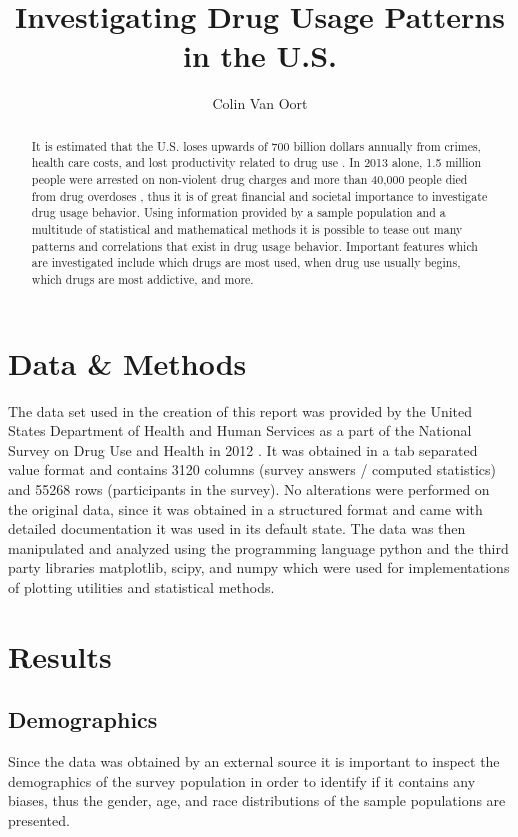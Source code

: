 \documentclass[a4 paper]{article}
\title{Investigating Drug Usage Patterns in the U.S.}
\author{Colin Van Oort}
\begin{document}
\maketitle

\begin{abstract}
It is estimated that the U.S. loses upwards of 700 billion dollars annually from crimes, health care costs, and lost productivity related to drug use \cite{NIDA}. In 2013 alone, 1.5 million people were arrested on non-violent drug charges and more than 40,000 people died from drug overdoses \cite{DPA}, thus it is of great financial and societal importance to investigate drug usage behavior. Using information provided by a sample population and a multitude of statistical and mathematical methods it is possible to tease out many patterns and correlations that exist in drug usage behavior. Important features which are investigated include which drugs are most used, when drug use usually begins, which drugs are most addictive, and more.
\end{abstract}


\section*{Data \& Methods}

The data set used in the creation of this report was provided by the United States Department of Health and Human Services as a part of the National Survey on Drug Use and Health in 2012 \cite{USDOH}. It was obtained in a tab separated value format and contains 3120 columns (survey answers / computed statistics) and 55268 rows (participants in the survey). No alterations were performed on the original data, since it was obtained in a structured format and came with detailed documentation it was used in its default state. The data was then manipulated and analyzed using the programming language python and the third party libraries matplotlib, scipy, and numpy which were used for implementations of plotting utilities and statistical methods.


\section*{Results}

\subsection*{Demographics}
Since the data was obtained by an external source it is important to inspect the demographics of the survey population in order to identify if it contains any biases, thus the gender, age, and race distributions of the sample populations are presented. 
\end{document}
